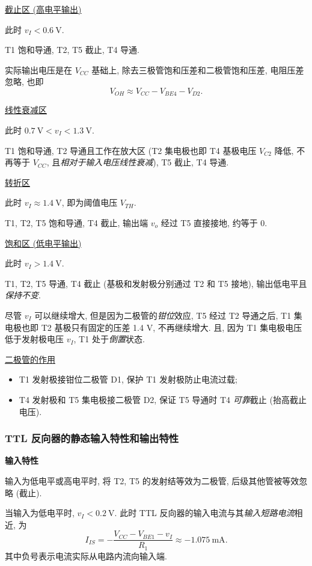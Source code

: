 \underline{截止区 (高电平输出)}

此时 $v_I<0.6\ \text{V}$.

T1 饱和导通, T2, T5 截止, T4 导通.

实际输出电压是在 $V_{CC}$ 基础上, 除去三极管饱和压差和二极管饱和压差, 电阻压差忽略, 也即
\begin{equation}
    V_{OH}\approx V_{CC}-V_{BE4}-V_{D2}.
\end{equation}

\underline{线性衰减区}

此时 $0.7\ \text{V}<v_I<1.3\ \text{V}$.

T1 饱和导通, T2 导通且工作在放大区 (T2 集电极也即 T4 基极电压 $V_{C2}$ 降低, 不再等于 $V_{CC}$, 且\textit{相对于输入电压线性衰减}), T5 截止, T4 导通.

\underline{转折区}

此时 $v_I\approx 1.4\ \text{V}$, 即为阈值电压 $V_{TH}$.

T1, T2, T5 饱和导通, T4 截止, 输出端 $v_o$ 经过 T5 直接接地, 约等于 0.

\underline{饱和区 (低电平输出)}

此时 $v_I>1.4\ \text{V}$.

T1, T2, T5 导通, T4 截止 (基极和发射极分别通过 T2 和 T5 接地), 输出低电平且\textit{保持不变}.

尽管 $v_I$ 可以继续增大, 但是因为二极管的\textit{钳位}效应, T5 经过 T2 导通之后, T1 集电极也即 T2 基极只有固定的压差 1.4 V, 不再继续增大. 且, 因为 T1 集电极电压低于发射极电压 $v_I$, T1 处于\textit{倒置}状态.

\underline{二极管的作用}
\begin{itemize}
    \item T1 发射极接钳位二极管 D1, 保护 T1 发射极防止电流过载;
    \item T4 发射极和 T5 集电极接二极管 D2, 保证 T5 导通时 T4 \textit{可靠}截止 (抬高截止电压).
\end{itemize}

\subsubsection{TTL 反向器的静态输入特性和输出特性}
\textbf{输入特性}

输入为低电平或高电平时, 将 T2, T5 的发射结等效为二极管, 后级其他管被等效忽略 (截止).

当输入为低电平时, $v_I<0.2\ \text{V}$. 此时 TTL 反向器的输入电流与其\textit{输入短路电流}相近, 为
\begin{equation}
    I_{IS}=-\frac{V_{CC}-V_{BE1}-v_I}{R_1}\approx-1.075\ \text{mA}.
\end{equation}
其中负号表示电流实际从电路内流向输入端.

